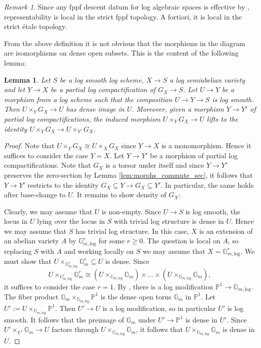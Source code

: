 \documentclass[11pt]{amsart}
\newtheorem{lemma}[theorem]{Lemma}
\theoremstyle{definition}
\theoremstyle{remark}
\newtheorem{remark}[theorem]{Remark}
\def\log{\mathrm{log}}
\begin{document}
\begin{remark}
	Since any fppf descent datum for log algebraic spaces is
	effective by \cite[0ADV]{stacks-project}, representability
	is local in the strict fppf topology.
	A fortiori, it is local in the strict étale topology.
\end{remark}

From the above definition it is not obvious that the morphisms in the diagram
are isomorphisms on dense open subsets. This is the content of the following lemma:

\begin{lemma}
	\label{lem:bir_is_bir}
	Let $S$ be a log smooth log scheme, $X\to S$ a log semiabelian variety and
	let $Y\to X$ be a partial log compactification of $G_X\to S$. Let $U\to Y$ be a morphism
	from a log scheme such that the composition $U\to Y\to S$ is log smooth. Then
	$U\times_Y G_X\to U$ has dense image in $U$. Moreover, given a morphism $Y\to Y'$ of
	partial log compactifications, the induced morphism $U\times_Y G_X\to U$ lifts to
	the identity $U\times_Y G_X\to U\times_{Y'}G_X$.
\end{lemma}

\begin{proof}
	Note that $U\times_Y G_X\cong U\times_X G_X$ since $Y\to X$ is a monomorphism. Hence it suffices
	to consider the case $Y=X$. Let $Y\to Y'$ be a morphism of partial log compactifications. Note that $G_X$
	is a torsor under itself and since $Y\to Y'$ preserves the zero-section by Lemma \ref{lem:morphs_commute_sec}, it follows that $Y\to Y'$
	restricts to the identity $G_X\subseteq Y\to G_X\subseteq Y'$. In particular, the same holds after base-change
	to $U$. It remains to show density of $G_X$:

	Clearly, we may assume that $U$ is non-empty. Since $U\to S$ is log smooth, the locus
	in $U$ lying over the locus in $S$ with trivial log structure is dense in $U$. Hence
	we may assume that $S$ has trivial log structure. In this case, $X$ is an extension of
	an abelian variety $A$ by $\mathbb{G}_{m,\log}^{r}$ for some $r\ge 0$. The question is local
	on $A$, so replacing $S$ with $A$ and working locally on $S$ we may assume that $X=\mathbb{G}_{m,\log}^{r}$.
	We must show that $U\times_{\mathbb{G}_{m,\log}^{r}}\mathbb{G}_{m}^{r}\subseteq U$ is dense.
	Since
	$$U\times_{\mathbb{G}_{m,\log}^{r}}\mathbb{G}_{m}^{r}\cong (U\times_{\mathbb{G}_{m,\log}}\mathbb{G}_{m})\times\dots\times(U\times_{\mathbb{G}_{m,\log}}\mathbb{G}_{m}),$$
	it suffices to consider the case $r=1$. By \cite[Lemma 2.2.7.3]{TheLogarithmicMolcho2022},
	there is a log modification
	$\mathbb{P}^{1}\to \mathbb{G}_{m,\log}$. The fiber product
	$\mathbb{G}_{m}\times_{\mathbb{G}_{m,\log}}\mathbb{P}^{1}$
	is the dense open torus $\mathbb{G}_m$
	in $\mathbb{P}^{1}$. Let $U':=U\times_{\mathbb{G}_{m,\log}}\mathbb{P}^{1}$. Then $U'\to U$ is a log modification,
	so in particular $U'$ is log smooth. It follows that the preimage of $\mathbb{G}_{m}$ under $U'\to \mathbb{P}^{1}$ is dense
	in $U'$. Since $U'\times_{\mathbb{P}^{1}}\mathbb{G}_{m}\to U$ factors through $U\times_{\mathbb{G}_{m,\log}}\mathbb{G}_{m}$,
	it follows that $U\times_{\mathbb{G}_{m,\log}}\mathbb{G}_{m}$ is dense in $U$.
\end{proof}
\end{document}
